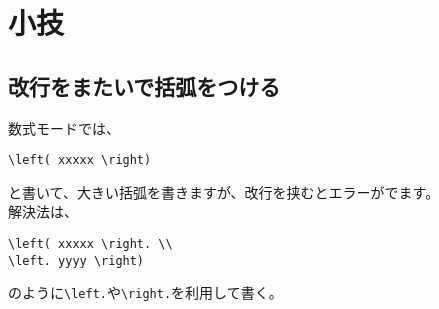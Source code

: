 \documentclass[11pt, oneside]{article}   	%
\begin{document}
\section{小技}
\subsection{改行をまたいで括弧をつける}
数式モードでは、
\begin{lstlisting}
\left( xxxxx \right)
\end{lstlisting}
と書いて、大きい括弧を書きますが、改行を挟むとエラーがでます。\\
解決法は、
\begin{lstlisting}
\left( xxxxx \right. \\
\left. yyyy \right)
\end{lstlisting}
のように\verb|\left.|や\verb|\right.|を利用して書く。
\end{document}
